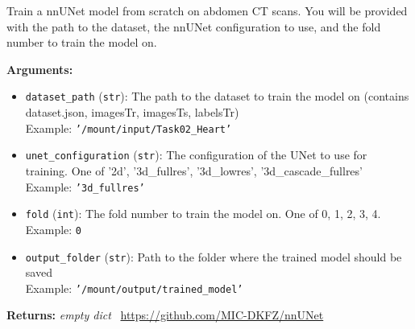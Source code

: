 \begin{tcolorbox}[title={\texttt{nnunet\_train\_model}}]
Train a nnUNet model from scratch on abdomen CT scans. You will be provided with  the path to the dataset, the nnUNet configuration to use, and the fold number  to train the model on.

\vspace{.5em}
\textbf{Arguments:}
\begin{itemize}[topsep=0pt,parsep=-1pt,partopsep=0pt]
\item \texttt{dataset\_path} (\texttt{str}): The path to the dataset to train the model on (contains dataset.json, imagesTr, imagesTs, labelsTr)\\  Example: \texttt{'/mount/input/Task02\_Heart'}
\item \texttt{unet\_configuration} (\texttt{str}): The configuration of the UNet to use for training. One of '2d', '3d\_fullres', '3d\_lowres', '3d\_cascade\_fullres'\\  Example: \texttt{'3d\_fullres'}
\item \texttt{fold} (\texttt{int}): The fold number to train the model on. One of 0, 1, 2, 3, 4.\\  Example: \texttt{0}
\item \texttt{output\_folder} (\texttt{str}): Path to the folder where the trained model should be saved\\  Example: \texttt{'/mount/output/trained\_model'}
\end{itemize}

\vspace{.5em}
\textbf{Returns:} \textit{empty dict}
\tcblower
\setlength{\hangindent}{\widthof{\faGithub~}}
\faGithub~\url{https://github.com/MIC-DKFZ/nnUNet}

\vspace{.5em}\setlength{\hangindent}{\widthof{\faFile*[regular]~}}\faFile*[regular]~


\end{tcolorbox}

